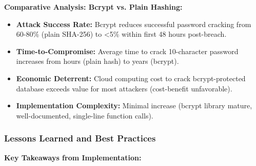 \documentclass[12pt,a4paper]{article}
\begin{document}
\vspace{0.5em}

\textbf{Comparative Analysis: Bcrypt vs. Plain Hashing:}

\begin{itemize}[leftmargin=2em, itemsep=6pt]
    \item \textbf{Attack Success Rate:} Bcrypt reduces successful password cracking from 60-80\% (plain SHA-256) to <5\% within first 48 hours post-breach.
    \item \textbf{Time-to-Compromise:} Average time to crack 10-character password increases from hours (plain hash) to years (bcrypt).
    \item \textbf{Economic Deterrent:} Cloud computing cost to crack bcrypt-protected database exceeds value for most attackers (cost-benefit unfavorable).
    \item \textbf{Implementation Complexity:} Minimal increase (bcrypt library mature, well-documented, single-line function calls).
\end{itemize}

\subsubsection{Lessons Learned and Best Practices}

\textbf{Key Takeaways from Implementation:}
\end{document}
